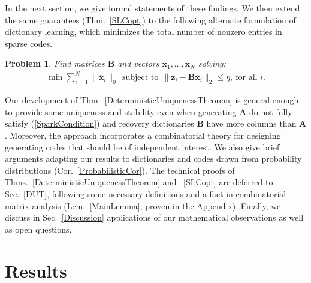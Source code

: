 \documentclass[journal, twocolumn]{IEEEtran}
\newtheorem{problem}{Problem}
\begin{document}
In the next section, we give formal statements of these findings.  We then extend the same guarantees (Thm.~\ref{SLCopt}) to the following alternate formulation of dictionary learning, which minimizes the total number of nonzero entries in sparse codes.

\begin{problem}\label{OptimizationProblem}
Find matrices $\mathbf{B}$ and vectors \mbox{$\mathbf{\overline x}_1, \ldots, \mathbf{\overline x}_N$} solving:
\begin{align}\label{minsum}
\min \sum_{i = 1}^N \|\mathbf{\overline x}_{i}\|_0 \ \
\text{subject to} \ \ \|\mathbf{z}_i - \mathbf{B}\mathbf{\overline x}_i\|_2 \leq \eta, \ \text{for all $i$}.
\end{align}
\end{problem}

Our development of Thm.~\ref{DeterministicUniquenessTheorem} is general enough to provide some uniqueness and stability even when generating $\mathbf{A}$ do not fully satisfy (\ref{SparkCondition}) and recovery dictionaries $\mathbf{B}$ have more columns than $\mathbf{A}$.  Moreover, the approach incorporates a combinatorial theory for designing generating codes that should be of independent interest. We also give brief arguments adapting our results to dictionaries and codes drawn from probability distributions (Cor.~\ref{ProbabilisticCor}). The technical proofs of Thms.~\ref{DeterministicUniquenessTheorem} and ~\ref{SLCopt} are deferred to Sec.~\ref{DUT}, following some necessary definitions and a fact in combinatorial matrix analysis (Lem.~\ref{MainLemma}; proven in the Appendix). Finally, we discuss in Sec.~\ref{Discussion} applications of our mathematical observations as well as open questions. 

\section{Results}\label{Results}

\end{document}
